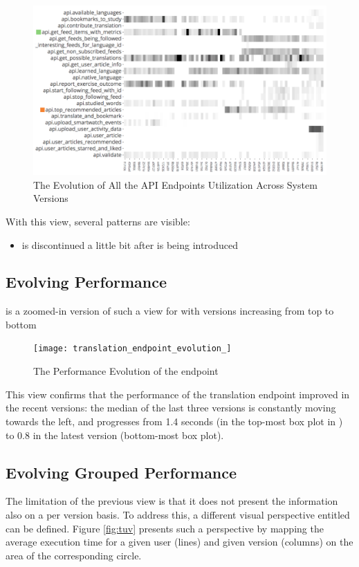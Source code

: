     \begin{figure}[h!]
      \centering
      \includegraphics[width=0.9\linewidth]{utilization-evolution}
      \caption{The Evolution of All the API Endpoints Utilization Across System Versions}
      \label{fig:mv-util}
    \end{figure}

  With this view, several patterns are visible:
  \begin{itemize}
    
    \item \epFeedItems is discontinued a little bit after \epTopArticles is being introduced

  \end{itemize}


  \subsection*{Evolving Performance}

     is a zoomed-in version of such a view for \epTranslationsColor with versions increasing from top to bottom

    \begin{figure}[h!]
      \centering
      \texttt{[image: translation\_endpoint\_evolution\_]}
      \caption{The Performance Evolution of the \epTranslations endpoint}
      \label{fig:tee}
    \end{figure}


  This view confirms that the performance of the translation endpoint improved in the recent versions: the median of the last three versions is constantly moving towards the left, and progresses from 1.4 seconds (in the top-most box plot in ) to 0.8 in the latest version (bottom-most box plot).


\subsection*{Evolving Grouped Performance}
  The limitation of the previous view is that it does not present the information also on a per version basis. To address this, a different visual perspective entitled  can be defined. Figure \ref{fig:tuv} presents such a perspective by mapping the average execution time for a given user (lines) and given version (columns) on the area of the corresponding circle. 

